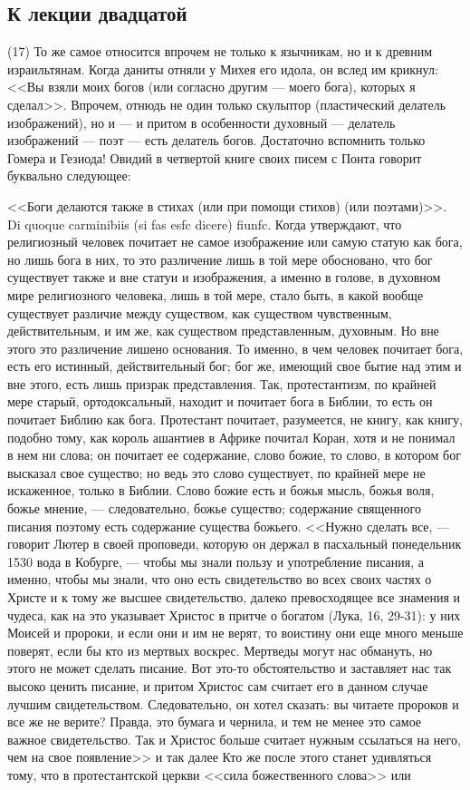 \documentclass[12pt]{article}
\begin{document}
\subsection*{К лекции двадцатой}

(17) То же самое относится впрочем не только к язычникам, но и к древним израильтянам. Когда даниты отняли у Михея его идола, он вслед им крикнул: <<Вы взяли моих богов (или согласно другим --- моего бога), которых я сделал>>. Впрочем, отнюдь не один только скульптор (пластический делатель изображений), но и --- и притом в особенности духовный --- делатель изображений --- поэт --- есть делатель богов. Достаточно вспомнить только Гомера и Гезиода! Овидий в четвертой книге своих писем с Понта говорит буквально следующее: 

<<Боги делаются также в стихах (или при помощи стихов) (или поэтами)>>. Di quoque carminibiis (si fas esfc dicere) fiunfc. Когда утверждают, что религиозный человек почитает не самое изображение или самую статую как бога, но лишь бога в них, то это различение лишь в той мере обосновано, что бог существует также и вне статуи и изображения, а именно в голове, в духовном мире религиозного человека, лишь в той мере, стало быть, в какой вообще существует различие между существом, как существом чувственным, действительным, и им же, как существом представленным, духовным. Но вне этого это различение лишено основания. То именно, в чем человек почитает бога, есть его истинный, действительный бог; бог же, имеющий свое бытие над этим и вне этого, есть лишь призрак представления. Так, протестантизм, по крайней мере старый, ортодоксальный, находит и почитает бога в Библии, то есть он почитает Библию как бога. Протестант почитает, разумеется, не книгу, как книгу, подобно тому, как король ашантиев в Африке почитал Коран, хотя и не понимал в нем ни слова; он почитает ее содержание, слово божие, то слово, в котором бог высказал свое существо; но ведь это слово существует, по крайней мере не искаженное, только в Библии. Слово божие есть и божья мысль, божья воля, божье мнение, --- следовательно, божье существо; содержание священного писания поэтому есть содержание существа божьего. <<Нужно сделать все, --- говорит Лютер в своей проповеди, которую он держал в пасхальный понедельник 1530 вода в Кобурге, --- чтобы мы знали пользу и употребление писания, а именно, чтобы мы знали, что оно есть свидетельство во всех своих частях о Христе и к тому же высшее свидетельство, далеко превосходящее все знамения и чудеса, как на это указывает Христос в притче о богатом (Лука, 16, 29-31): у них Моисей и пророки, и если они и им не верят, то воистину они еще много меньше поверят, если бы кто из мертвых воскрес. Мертведы могут нас обмануть, но этого не может сделать писание. Вот это-то обстоятельство и заставляет нас так высоко ценить писание, и притом Христос сам считает его в данном случае лучшим свидетельством. Следовательно, он хотел сказать: вы читаете пророков и все же не верите? Правда, это бумага и чернила, и тем не менее это самое важное свидетельство. Так и Христос больше считает нужным ссылаться на него, чем на свое появление>> и так далее Кто же после этого станет удивляться тому, что в протестантской церкви <<сила божественного слова>>  или 
\end{document}
